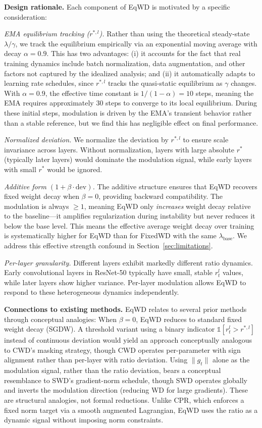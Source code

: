\documentclass{article}
\begin{document}
\textbf{Design rationale.} Each component of EqWD is motivated by a
specific consideration:

\emph{EMA equilibrium tracking ($r^{*,l}$).} Rather than using the
theoretical steady-state $\lambda / \gamma$, we track the equilibrium
empirically via an exponential moving average with decay
$\alpha = 0.9$. This has two advantages: (i) it accounts for the fact
that real training dynamics include batch normalization, data
augmentation, and other factors not captured by the idealized analysis;
and (ii) it automatically adapts to learning rate schedules, since
$r^{*,l}$ tracks the quasi-static equilibrium as $\gamma$ changes.
With $\alpha = 0.9$, the effective time constant is
$1/(1-\alpha) = 10$ steps, meaning the EMA requires approximately 30
steps to converge to its local equilibrium. During these initial steps,
modulation is driven by the EMA's transient behavior rather than a
stable reference, but we find this has negligible effect on final
performance.

\emph{Normalized deviation.} We normalize the deviation by $r^{*,l}$
to ensure scale invariance across layers. Without normalization, layers
with large absolute $r^*$ (typically later layers) would dominate the
modulation signal, while early layers with small $r^*$ would be
ignored.

\emph{Additive form $(1 + \beta \cdot \text{dev})$.} The additive
structure ensures that EqWD recovers fixed weight decay when
$\beta = 0$, providing backward compatibility. The modulation is
always $\geq 1$, meaning EqWD only \emph{increases} weight decay
relative to the baseline---it amplifies regularization during
instability but never reduces it below the base level. This means the
effective average weight decay over training is systematically higher
for EqWD than for FixedWD with the same $\lambda_{\text{base}}$. We
address this effective strength confound in Section~\ref{sec:limitations}.

\emph{Per-layer granularity.} Different layers exhibit markedly
different ratio dynamics. Early convolutional layers in ResNet-50
typically have small, stable $r_t^l$ values, while later layers show
higher variance. Per-layer modulation allows EqWD to respond to these
heterogeneous dynamics independently.

\textbf{Connections to existing methods.} EqWD relates to several prior
methods through conceptual analogies: When $\beta = 0$, EqWD reduces
to standard fixed weight decay (SGDW). A threshold variant using a
binary indicator $\mathbb{1}[r_t^l > r^{*,l}]$ instead of continuous
deviation would yield an approach conceptually analogous to CWD's
masking strategy, though CWD operates per-parameter with sign alignment
rather than per-layer with ratio deviation. Using $\|g_t\|$ alone as
the modulation signal, rather than the ratio deviation, bears a
conceptual resemblance to SWD's gradient-norm schedule, though SWD
operates globally and inverts the modulation direction (reducing WD for
large gradients). These are structural analogies, not formal reductions.
Unlike CPR, which enforces a fixed norm target via a smooth augmented
Lagrangian, EqWD uses the ratio as a dynamic signal without imposing
norm constraints.
\end{document}
